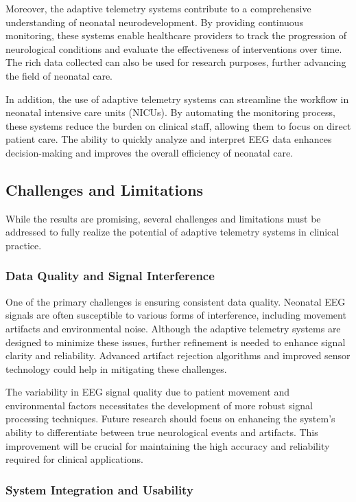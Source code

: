 \documentclass[12pt,journal,compsoc]{IEEEtran}
\begin{document}
Moreover, the adaptive telemetry systems contribute to a comprehensive understanding of neonatal neurodevelopment. By providing continuous monitoring, these systems enable healthcare providers to track the progression of neurological conditions and evaluate the effectiveness of interventions over time. The rich data collected can also be used for research purposes, further advancing the field of neonatal care.

In addition, the use of adaptive telemetry systems can streamline the workflow in neonatal intensive care units (NICUs). By automating the monitoring process, these systems reduce the burden on clinical staff, allowing them to focus on direct patient care. The ability to quickly analyze and interpret EEG data enhances decision-making and improves the overall efficiency of neonatal care.

\subsection{Challenges and Limitations}

While the results are promising, several challenges and limitations must be addressed to fully realize the potential of adaptive telemetry systems in clinical practice.

\subsubsection{Data Quality and Signal Interference}

One of the primary challenges is ensuring consistent data quality. Neonatal EEG signals are often susceptible to various forms of interference, including movement artifacts and environmental noise. Although the adaptive telemetry systems are designed to minimize these issues, further refinement is needed to enhance signal clarity and reliability. Advanced artifact rejection algorithms and improved sensor technology could help in mitigating these challenges.

The variability in EEG signal quality due to patient movement and environmental factors necessitates the development of more robust signal processing techniques. Future research should focus on enhancing the system's ability to differentiate between true neurological events and artifacts. This improvement will be crucial for maintaining the high accuracy and reliability required for clinical applications.

\subsubsection{System Integration and Usability}
\end{document}
